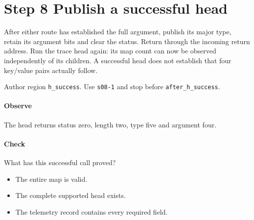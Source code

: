 \section{Step 8 Publish a successful head}\label{cbor-s08}
After either route has established the full argument, publish its major type, retain its argument bits and clear the status. Return through the incoming return address. Run the trace head again: its map count can now be observed independently of its children. A successful head does not establish that four key/value pairs actually follow.

Author region \texttt{h\_success}. Use \texttt{s08-1} and stop before \texttt{after\_h\_success}.

\paragraph{Observe} The head returns status zero, length two, type five and argument four.

\paragraph{Check} What has this successful call proved?
\begin{itemize}
  \item[A.] The entire map is valid.
  \item[B.] The complete supported head exists.
  \item[C.] The telemetry record contains every required field.
\end{itemize}
